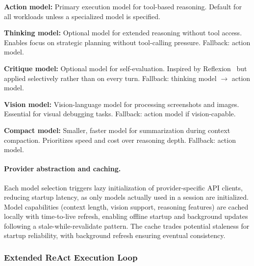 \begin{packeditemize}
\item \textbf{Action model:} Primary execution model for tool-based reasoning. Default for all workloads unless a specialized model is specified.

\item \textbf{Thinking model:} Optional model for extended reasoning without tool access. Enables focus on strategic planning without tool-calling pressure. Fallback: action model.

\item \textbf{Critique model:} Optional model for self-evaluation. Inspired by Reflexion~\cite{shinn2023reflexion} but applied selectively rather than on every turn. Fallback: thinking model $\to$ action model.

\item \textbf{Vision model:} Vision-language model for processing screenshots and images. Essential for visual debugging tasks. Fallback: action model if vision-capable.

\item \textbf{Compact model:} Smaller, faster model for summarization during context compaction. Prioritizes speed and cost over reasoning depth. Fallback: action model.
\end{packeditemize}

\paragraph{Provider abstraction and caching.} Each model selection triggers lazy initialization of provider-specific API clients, reducing startup latency, as only models actually used in a session are initialized. Model capabilities (context length, vision support, reasoning features) are cached locally with time-to-live refresh, enabling offline startup and background updates following a stale-while-revalidate pattern. The cache trades potential staleness for startup reliability, with background refresh ensuring eventual consistency.


\subsubsection{Extended ReAct Execution Loop}
\label{sec:react_executor}

